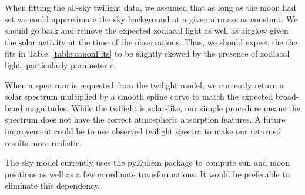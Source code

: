 \documentclass[]{spie}
\begin{document}
When fitting the all-sky twilight data, we assumed that as long as the moon had set we could approximate the sky background at a given airmass as constant. We should go back and remove the expected zodiacal light as well as airglow given the solar activity at the time of the observations. Thus, we should expect the the fits in Table~\ref{table:canonFits} to be slightly skewed by the presence of zodiacal light, particularly parameter $c$.  

When a spectrum is requested from the twilight model, we currently return a solar spectrum multiplied by a smooth spline curve to match the expected broad-band magnitudes.  While the twilight is solar-like, our simple procedure means the spectrum does not have the correct atmospheric absorption features.  A future improvement could be to use observed twilight spectra to make our returned results more realistic.

The sky model currently uses the pyEphem package to compute sun and moon positions as well as a few coordinate transformations. It would be preferable to eliminate this dependency.  




\end{document}
